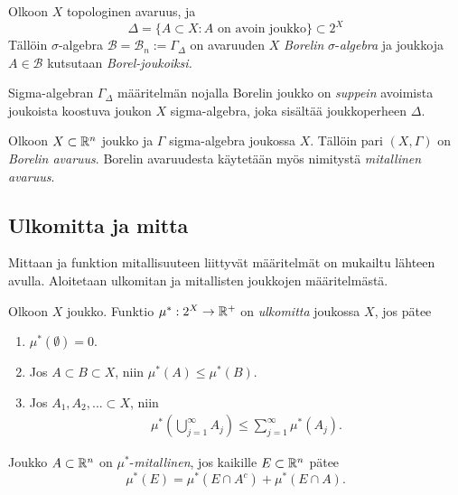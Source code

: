 \documentclass[12pt,oneside,a4paper]{amsbook} %
\begin{document}
\begin{definition}
    Olkoon $X$ topologinen avaruus, ja 
    \[\Delta = \{A \subset X : A \text{ on avoin joukko}\} \subset 2^X \]
    Tällöin $\sigma$-algebra $\mathcal B = \mathcal B_n := \Gamma_\Delta$ on avaruuden $X$ \textit{Borelin} $\sigma$-\textit{algebra} ja joukkoja $A\in \mathcal B$ kutsutaan \textit{Borel-joukoiksi.} 
\end{definition}

Sigma-algebran $\Gamma_\Delta$ määritelmän nojalla Borelin joukko on \textit{suppein} avoimista joukoista koostuva joukon $X$ sigma-algebra, joka sisältää joukkoperheen $\Delta$.

\begin{definition}
    Olkoon $X\subset \mathbb{R}^n$ joukko ja $\Gamma$ sigma-algebra joukossa $X$. Tällöin pari $(X, \Gamma)$ on \textit{Borelin avaruus}. Borelin avaruudesta käytetään myös nimitystä \textit{mitallinen avaruus}.
\end{definition}
\subsection{Ulkomitta ja mitta}
Mittaan ja funktion mitallisuuteen liittyvät määritelmät on mukailtu lähteen \cite[s.88-110]{lehrbäck} avulla. Aloitetaan ulkomitan ja mitallisten joukkojen määritelmästä.
\begin{definition}
    Olkoon $X$ joukko. Funktio $\mu^*: 2^X \to {\mathbb{R}^{+}}$ on \textit{ulkomitta} joukossa $X$, jos pätee
    \begin{enumerate}
        \item $\mu^*(\emptyset) = 0.$
        \item Jos $A \subset B \subset X$, niin $\mu^*(A) \le \mu^*(B)$.
        \item Jos $A_1, A_2, ... \subset X$, niin 
        \begin{align*}
            \mu^*\left(\bigcup_{j=1}^\infty A_j \right) \le \sum_{j = 1}^\infty\mu^*(A_j).
        \end{align*}
    \end{enumerate}
\end{definition}

\begin{definition}
    Joukko $A\subset \mathbb{R}^n$ on $\mu^*$-\textit{mitallinen}, jos kaikille $E\subset \mathbb{R}^n$ pätee
    \begin{equation}\label{eq:measurable}
        \mu^*(E) = \mu^*(E \cap A^c) + \mu^*(E\cap A).
    \end{equation}
\end{definition}
\end{document}
